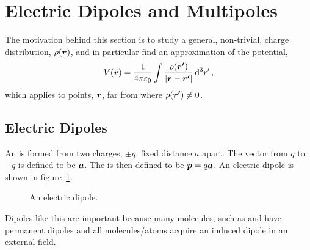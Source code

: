     \section{Electric Dipoles and Multipoles}
    The motivation behind this section is to study a general, non-trivial, charge distribution, \(\rho(\bm{r})\), and in particular find an approximation of the potential,
    \[V(\bm{r}) = \frac{1}{4\pi\varepsilon_0}\int\frac{\rho(\bm{r'})}{\abs{\bm{r} - \bm{r'}}}\dd[3]{r'},\]
    which applies to points, \(\bm{r}\), far from where \(\rho(\bm{\bm{r'}}) \ne 0\).
    
    \subsection{Electric Dipoles}
    An  is formed from two charges, \(\pm q\), fixed distance \(a\) apart.
    The vector from \(q\) to \(-q\) is defined to be \(\bm{a}\).
    The  is then defined to be \(\bm{p} = q\bm{a}\).
    An electric dipole is shown in figure~\ref{fig:electric dipole}.
    \begin{figure}[ht]
        \centering
        \caption{An electric dipole.}
        \label{fig:electric dipole}
    \end{figure}
    Dipoles like this are important because many molecules, such as  and  have permanent dipoles and all molecules/atoms acquire an induced dipole in an external field.
    
